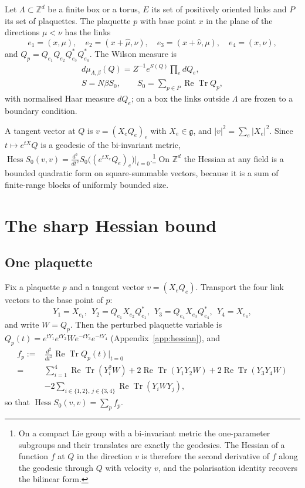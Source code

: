 \documentclass[aps,prd,twocolumn,superscriptaddress,nofootinbib,longbibliography,floatfix,amsmath,amssymb,10pt]{revtex4-2}
\theoremstyle{definition}
\theoremstyle{remark}
\newcommand{\Z}{\mathbb{Z}}
\newcommand{\g}{\mathfrak{g}}
\newcommand{\ReTr}{\operatorname{Re}\operatorname{Tr}}
\newcommand{\Hess}{\operatorname{Hess}}
\begin{document}
Let $\Lambda\subset\Z^d$ be a finite box or a torus, $E$ its set of
positively oriented links and $P$ its set of plaquettes. The plaquette $p$
with base point $x$ in the plane of the directions $\mu<\nu$ has the links
\[
e_1=(x,\mu),\quad e_2=(x+\hat\mu,\nu),\quad e_3=(x+\hat\nu,\mu),\quad
e_4=(x,\nu),
\]
and $Q_p=Q_{e_1}Q_{e_2}Q_{e_3}^*Q_{e_4}^*$. The Wilson measure is
\begin{equation}\label{eq:wilson}
\begin{gathered}
d\mu_{\Lambda,\beta}(Q)=Z^{-1}e^{S(Q)}\prod_e dQ_e,\\
S=N\beta S_0,\qquad S_0=\sum_{p\in P}\ReTr Q_p,
\end{gathered}
\end{equation}
with normalised Haar measure $dQ_e$; on a box the links outside $\Lambda$ are
frozen to a boundary condition.

A tangent vector at $Q$ is $v=(X_eQ_e)_e$ with $X_e\in\g$, and
$|v|^2=\sum_e|X_e|^2$. Since $t\mapsto e^{tX}Q$ is a geodesic of the
bi-invariant metric, $\Hess S_0(v,v)=\frac{d^2}{dt^2}S_0\bigl((e^{tX_e}Q_e)_e
\bigr)|_{t=0}$.\footnote{On a compact Lie group with a bi-invariant metric
the one-parameter subgroups and their translates are exactly the geodesics.
The Hessian of a function $f$ at $Q$ in the direction $v$ is therefore the
second derivative of $f$ along the geodesic through $Q$ with velocity $v$,
and the polarisation identity recovers the bilinear form.} On $\Z^d$ the
Hessian at any field is a bounded quadratic form on square-summable vectors,
because it is a sum of finite-range blocks of uniformly bounded size.

\section{The sharp Hessian bound}\label{sec:hessian}

\subsection{One plaquette}

Fix a plaquette $p$ and a tangent vector $v=(X_eQ_e)$. Transport the four
link vectors to the base point of $p$:
\begin{equation}\label{eq:transport}
Y_1=X_{e_1},\ \ Y_2=Q_{e_1}X_{e_2}Q_{e_1}^*,\ \
Y_3=Q_{e_4}X_{e_3}Q_{e_4}^*,\ \ Y_4=X_{e_4},
\end{equation}
and write $W=Q_p$. Then the perturbed plaquette variable is
$Q_p(t)=e^{tY_1}e^{tY_2}We^{-tY_3}e^{-tY_4}$ (Appendix~\ref{app:hessian}), and
\begin{equation}\label{eq:fp}
\begin{split}
f_p:={}&\frac{d^2}{dt^2}\ReTr Q_p(t)\Big|_{t=0}\\
={}&\sum_{i=1}^4\ReTr(Y_i^2W)+2\ReTr(Y_1Y_2W)+2\ReTr(Y_3Y_4W)\\
&-2\sum_{i\in\{1,2\},\,j\in\{3,4\}}\ReTr(Y_iWY_j),
\end{split}
\end{equation}
so that $\Hess S_0(v,v)=\sum_pf_p$.
\end{document}
